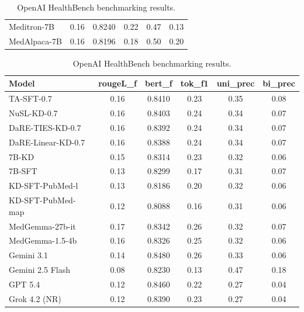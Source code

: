 \documentclass[conference]{IEEEtran}
\begin{document}
\begin{table}[h!]
\begin{minipage}[h]{0.48\textwidth}
\begin{tabular}{lccccc}
        Meditron-7B            & 0.16 & 0.8240 & 0.22 & 0.47 & 0.13 \\
        MedAlpaca-7B           & 0.16 & 0.8196 & 0.18 & 0.50 & 0.20 \\
        \bottomrule
        \end{tabular}
    \end{minipage}\hfill
    \begin{minipage}[h]{0.48\textwidth}
        \centering
        \caption{OpenAI HealthBench benchmarking results.}
        \label{tab:healthbench_bench}
        \scriptsize 
        \begin{tabular}{lccccc}
        \toprule
        \textbf{Model} & \textbf{rougeL\_f} & \textbf{bert\_f} & \textbf{tok\_f1} & \textbf{uni\_prec} & \textbf{bi\_prec} \\
        \midrule
        TA-SFT-0.7                 & 0.16 & 0.8410 & 0.23 & 0.35 & 0.08 \\
        NuSL-KD-0.7                & 0.16 & 0.8403 & 0.24 & 0.34 & 0.07 \\
        DaRE-TIES-KD-0.7           & 0.16 & 0.8392 & 0.24 & 0.34 & 0.07 \\
        DaRE-Linear-KD-0.7         & 0.16 & 0.8388 & 0.24 & 0.34 & 0.07 \\
        7B-KD                      & 0.15 & 0.8314 & 0.23 & 0.32 & 0.06 \\
        7B-SFT                     & 0.13 & 0.8299 & 0.17 & 0.31 & 0.07 \\
        KD-SFT-PubMed-l            & 0.13 & 0.8186 & 0.20 & 0.32 & 0.06 \\
        KD-SFT-PubMed-map          & 0.12 & 0.8088 & 0.16 & 0.31 & 0.06 \\
        MedGemma-27b-it            & 0.17 & 0.8342 & 0.26 & 0.32 & 0.07 \\
        MedGemma-1.5-4b            & 0.16 & 0.8326 & 0.25 & 0.32 & 0.06 \\
        Gemini 3.1                 & 0.14 & 0.8480 & 0.26 & 0.33 & 0.06 \\
        Gemini 2.5 Flash           & 0.08 & 0.8230 & 0.13 & 0.47 & 0.18 \\
        GPT 5.4                    & 0.12 & 0.8460 & 0.22 & 0.27 & 0.04 \\
        Grok 4.2 (NR)              & 0.12 & 0.8390 & 0.23 & 0.27 & 0.04 \\

\end{tabular}
\end{minipage}
\end{table}
\end{document}

